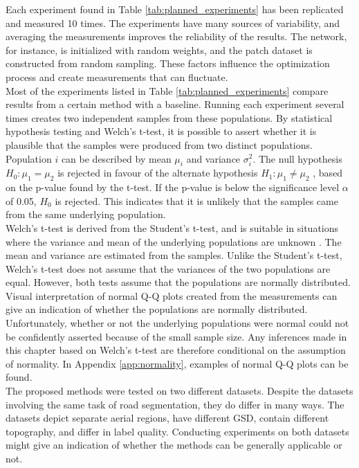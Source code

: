 Each experiment found in Table \ref{tab:planned_experiments} has been replicated and measured 10 times. The experiments have many sources of variability, and averaging the measurements improves the reliability of the results. The network, for instance, is initialized with random weights, and the patch dataset is constructed from random sampling. These factors influence the optimization process and create measurements that can fluctuate.\\

Most of the experiments listed in Table \ref{tab:planned_experiments} compare results from a certain method with a baseline. Running each experiment several times creates two independent samples from these populations. By statistical hypothesis testing and Welch's t-test, it is possible to assert whether it is plausible that the samples were produced from two distinct populations. Population $i$ can be described by mean $\mu_i$ and variance $\sigma^2_i$. The null hypothesis $H_0\colon \mu_1 = \mu_2$ is rejected in favour of the alternate hypothesis $H_1\colon\mu_1 \neq \mu_2$ , based on the p-value found by the t-test.  If the p-value is below the significance level $\alpha$ of 0.05, $H_0$ is rejected. This indicates that it is unlikely that the samples came from the same underlying population.\\

Welch's t-test is derived from the Student's t-test, and is suitable in situations where the variance and mean of the underlying populations are unknown \citep{walpole_probability}. The mean and variance are estimated from the samples. Unlike the Student's t-test, Welch's t-test does not assume that the variances of the two populations are equal. However, both tests assume that the populations are normally distributed. Visual interpretation of normal Q-Q plots created from the measurements can give an indication of whether the populations are normally distributed. Unfortunately, whether or not the underlying populations were normal could not be confidently asserted because of the small sample size. Any inferences made in this chapter based on Welch's t-test are therefore conditional on the assumption of normality. In Appendix \ref{app:normality}, examples of normal Q-Q plots can be found.\\ 
 
The proposed methods were tested on two different datasets. Despite the datasets involving the same task of road segmentation, they do differ in many ways. The datasets depict separate aerial regions, have different \ac{GSD}, contain different topography, and differ in label quality. Conducting experiments on both datasets might give an indication of whether the methods can be generally applicable or not.\\

